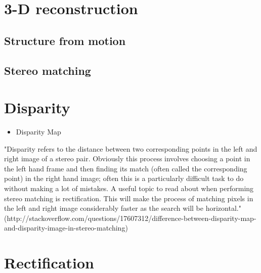 \section{3-D reconstruction}

\subsection{Structure from motion}\label{ssec:SfM}
\subsection{Stereo matching}\label{ssec:stereoMatch}






 
\section{Disparity}

\begin{itemize}
\item Disparity Map
\end{itemize}

"Disparity refers to the distance between two corresponding points in the left and right image of a stereo pair. Obviously this process involves choosing a point in the left hand frame and then finding its match (often called the corresponding point) in the right hand image; often this is a particularly difficult task to do without making a lot of mistakes. A useful topic to read about when performing stereo matching is rectification. This will make the process of matching pixels in the left and right image considerably faster as the search will be horizontal."
(http://stackoverflow.com/questions/17607312/difference-between-disparity-map-and-disparity-image-in-stereo-matching)

\section{Rectification}
